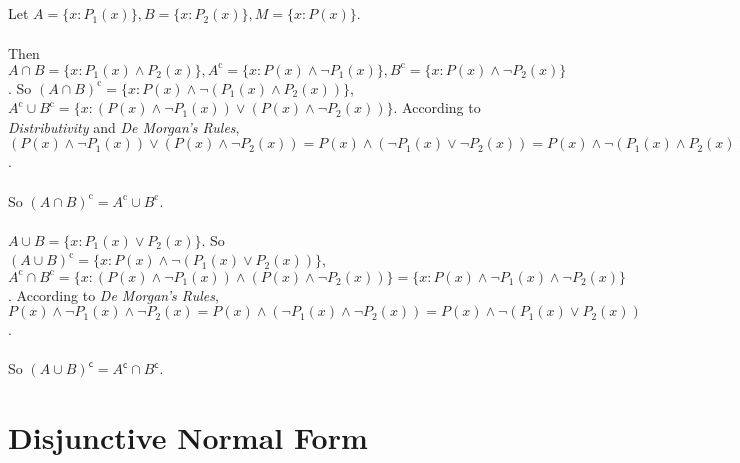 \documentclass[a4paper,12pt,titlepage]{article}
\begin{document}
\subsection{}
\paragraph{} Let $A=\lbrace x:P_1(x)\rbrace,B=\lbrace x:P_2(x)\rbrace,M=\lbrace x:P(x)\rbrace$. 
\paragraph{} Then $A\cap B=\lbrace x:P_1(x)\wedge P_2(x)\rbrace,A^{\mathrm{c}}=\lbrace x:P(x)\wedge \neg P_1(x)\rbrace,B^{\mathrm{c}}=\lbrace x:P(x)\wedge \neg P_2(x)\rbrace$. So $(A\cap B)^{\mathrm{c}}=\lbrace x:P(x)\wedge \neg (P_1(x)\wedge P_2(x))\rbrace$, $A^{\mathrm{c}}\cup B^{\mathrm{c}}=\lbrace x:(P(x)\wedge \neg P_1(x))\vee (P(x)\wedge \neg P_2(x))\rbrace$. According to \textit{Distributivity} and \textit{De Morgan's Rules}, $(P(x)\wedge \neg P_1(x))\vee (P(x)\wedge \neg P_2(x))=P(x)\wedge(\neg P_1(x)\vee\neg P_2(x))=P(x)\wedge \neg (P_1(x)\wedge P_2(x))$.
\paragraph{}So $(A \cap B)^{\mathrm{c}} = A^{\mathrm{c}} \cup B^{\mathrm{c}}$.

\paragraph{}$A\cup B=\lbrace x:P_1(x)\vee P_2(x)\rbrace$. So $(A\cup B)^{\mathrm{c}}=\lbrace x:P(x)\wedge \neg (P_1(x)\vee P_2(x))\rbrace$, $A^{\mathrm{c}}\cap B^{\mathrm{c}}=\lbrace x:(P(x)\wedge \neg P_1(x))\wedge (P(x)\wedge \neg P_2(x))\rbrace=\lbrace x:P(x)\wedge \neg P_1(x)\wedge  \neg P_2(x)\rbrace$. According to \textit{De Morgan's Rules}, $P(x)\wedge \neg P_1(x)\wedge  \neg P_2(x)=P(x)\wedge(\neg P_1(x)\wedge\neg P_2(x))=P(x)\wedge \neg (P_1(x)\vee P_2(x))$.

\paragraph{} So $(A \cup B)^{\mathsf{c}} = A^{\mathsf{c}} \cap B^{\mathsf{c}}$.

\section{Disjunctive Normal Form}
\end{document}
